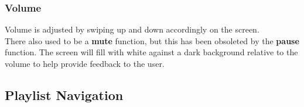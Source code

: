 \documentclass[12pt,letterpaper]{article}
\begin{document}

\subsubsection*{Volume}

Volume is adjusted by swiping up and down accordingly on the screen. \\
{\color{OliveGreen} There also used to be a \textbf{mute} function, but this has been obsoleted by the \textbf{pause} function.} {\color{blue} The screen will fill with white against a dark background relative to the volume to help provide feedback to the user.}

\subsection*{Playlist Navigation}
\end{document}
